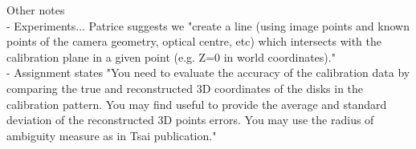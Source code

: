 Other notes\\
- Experiments... Patrice suggests we "create a line (using image points and known points of the camera geometry, optical centre, etc) which intersects with the calibration plane in a given point (e.g. Z=0 in world coordinates)."\\
- Assignment states "You need to evaluate the accuracy of the calibration data by comparing the true and reconstructed 3D coordinates of the disks in the calibration pattern. You may find useful to provide the average and standard deviation of the reconstructed 3D points errors. You may use the radius of ambiguity measure as in Tsai publication."\\

